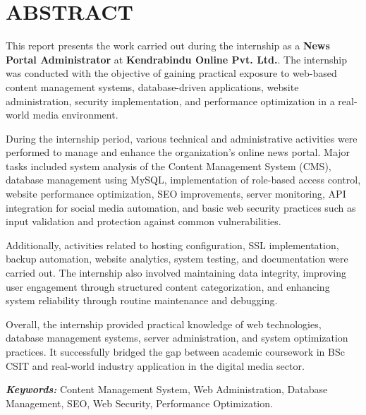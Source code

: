 \section*{\Large\centering \textbf{ABSTRACT}}

This report presents the work carried out during the internship as a \textbf{News Portal Administrator} at \textbf{Kendrabindu Online Pvt. Ltd.}. The internship was conducted with the objective of gaining practical exposure to web-based content management systems, database-driven applications, website administration, security implementation, and performance optimization in a real-world media environment.

During the internship period, various technical and administrative activities were performed to manage and enhance the organization's online news portal. Major tasks included system analysis of the Content Management System (CMS), database management using MySQL, implementation of role-based access control, website performance optimization, SEO improvements, server monitoring, API integration for social media automation, and basic web security practices such as input validation and protection against common vulnerabilities.

Additionally, activities related to hosting configuration, SSL implementation, backup automation, website analytics, system testing, and documentation were carried out. The internship also involved maintaining data integrity, improving user engagement through structured content categorization, and enhancing system reliability through routine maintenance and debugging.

Overall, the internship provided practical knowledge of web technologies, database management systems, server administration, and system optimization practices. It successfully bridged the gap between academic coursework in BSc CSIT and real-world industry application in the digital media sector.


\small
\noindent \textbf{\textit{Keywords:}} Content Management System, Web Administration, Database Management, SEO, Web Security, Performance Optimization.
\newpage